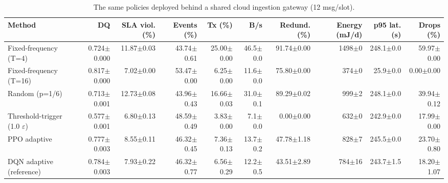 \begin{table}[t]
\centering
\caption{The same policies deployed behind a shared cloud ingestion gateway (12 msg/slot).}
\label{tab:gap}
\footnotesize
\begin{tabular}{lrrrrrrrrr}
\toprule
Method & DQ & SLA viol. (\%) & Events (\%) & Tx (\%) & B/s & Redund. (\%) & Energy (mJ/d) & p95 lat. (s) & Drops (\%) \\
\midrule
Fixed-frequency (T=4) & 0.724$\pm$0.000 & 11.87$\pm$0.03 & 43.74$\pm$0.61 & 25.00$\pm$0.00 & 46.5$\pm$0.0 & 91.74$\pm$0.00 & 1498$\pm$0 & 248.1$\pm$0.0 & 59.97$\pm$0.00 \\
Fixed-frequency (T=16) & 0.817$\pm$0.000 & 7.02$\pm$0.00 & 53.47$\pm$0.00 & 6.25$\pm$0.00 & 11.6$\pm$0.0 & 75.80$\pm$0.00 & 374$\pm$0 & 25.9$\pm$0.0 & 0.00$\pm$0.00 \\
Random (p=1/6) & 0.713$\pm$0.001 & 12.73$\pm$0.08 & 43.96$\pm$0.43 & 16.66$\pm$0.03 & 31.0$\pm$0.1 & 89.29$\pm$0.02 & 999$\pm$2 & 248.1$\pm$0.0 & 39.94$\pm$0.12 \\
Threshold-trigger (1.0 $\varepsilon$) & 0.577$\pm$0.001 & 6.80$\pm$0.13 & 48.59$\pm$0.49 & 3.83$\pm$0.00 & 7.1$\pm$0.0 & 0.00$\pm$0.00 & 632$\pm$0 & 242.9$\pm$0.0 & 17.99$\pm$0.00 \\
PPO adaptive & 0.777$\pm$0.003 & 8.55$\pm$0.11 & 46.32$\pm$0.45 & 7.36$\pm$0.13 & 13.7$\pm$0.2 & 47.78$\pm$1.18 & 828$\pm$7 & 245.5$\pm$0.0 & 23.70$\pm$0.80 \\
DQN adaptive (reference) & 0.784$\pm$0.003 & 7.93$\pm$0.22 & 46.32$\pm$0.77 & 6.56$\pm$0.29 & 12.2$\pm$0.5 & 43.51$\pm$2.89 & 784$\pm$16 & 243.7$\pm$1.5 & 18.20$\pm$1.07 \\
\bottomrule
\end{tabular}
\end{table}
